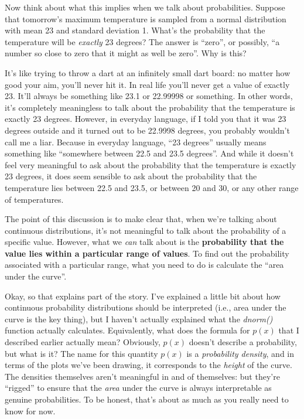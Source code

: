 \documentclass[
  letterpaper,
  DIV=11,
  numbers=noendperiod]{scrreprt}
\begin{document}
Now think about what this implies when we talk about probabilities.
Suppose that tomorrow's maximum temperature is sampled from a normal
distribution with mean 23 and standard deviation 1. What's the
probability that the temperature will be \emph{exactly} 23 degrees? The
answer is ``zero'', or possibly, ``a number so close to zero that it
might as well be zero''. Why is this?

It's like trying to throw a dart at an infinitely small dart board: no
matter how good your aim, you'll never hit it. In real life you'll never
get a value of exactly 23. It'll always be something like 23.1 or
22.99998 or something. In other words, it's completely meaningless to
talk about the probability that the temperature is exactly 23 degrees.
However, in everyday language, if I told you that it was 23 degrees
outside and it turned out to be 22.9998 degrees, you probably wouldn't
call me a liar. Because in everyday language, ``23 degrees'' usually
means something like ``somewhere between 22.5 and 23.5 degrees''. And
while it doesn't feel very meaningful to ask about the probability that
the temperature is exactly 23 degrees, it does seem sensible to ask
about the probability that the temperature lies between 22.5 and 23.5,
or between 20 and 30, or any other range of temperatures.

The point of this discussion is to make clear that, when we're talking
about continuous distributions, it's not meaningful to talk about the
probability of a specific value. However, what we \emph{can} talk about
is the \textbf{probability that the value lies within a particular range
of values}. To find out the probability associated with a particular
range, what you need to do is calculate the ``area under the curve''.

Okay, so that explains part of the story. I've explained a little bit
about how continuous probability distributions should be interpreted
(i.e., area under the curve is the key thing), but I haven't actually
explained what the \emph{dnorm()} function actually calculates.
Equivalently, what does the formula for \(p(x)\) that I described
earlier actually mean? Obviously, \(p(x)\) doesn't describe a
probability, but what is it? The name for this quantity \(p(x)\) is a
\emph{probability density}, and in terms of the plots we've been
drawing, it corresponds to the \emph{height} of the curve. The densities
themselves aren't meaningful in and of themselves: but they're
``rigged'' to ensure that the \emph{area} under the curve is always
interpretable as genuine probabilities. To be honest, that's about as
much as you really need to know for now.
\end{document}
